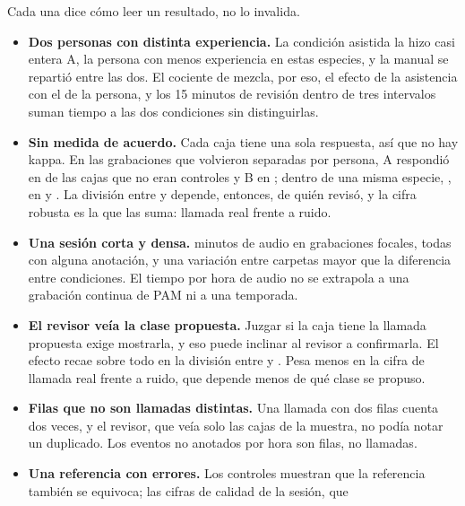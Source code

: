  Cada una dice cómo leer un resultado, no lo invalida.

\begin{itemize}
    \item \textbf{Dos personas con distinta experiencia.} La condición asistida la
          hizo casi entera A, la persona con menos experiencia en estas especies, y
          la manual se repartió entre las dos. El cociente de \uTimeRatio{} mezcla,
          por eso, el efecto de la asistencia con el de la persona, y los 15
          minutos de revisión dentro de tres intervalos suman tiempo a las dos
          condiciones sin distinguirlas.
    \item \textbf{Sin medida de acuerdo.} Cada caja tiene una sola respuesta, así
          que no hay kappa. En las \uPersonRecordings{} grabaciones que volvieron
          separadas por persona, A respondió  en \uPersonBoxA{} de las
          cajas que no eran controles y B en \uPersonBoxB{}; dentro de una misma
          especie, \uPersonSpecies{}, en \uPersonBoxSpeciesA{} y
          \uPersonBoxSpeciesB{}. La división entre  y 
          depende, entonces, de quién revisó, y la cifra robusta es la que las suma:
          llamada real frente a ruido.
    \item \textbf{Una sesión corta y densa.} \uSessionMinutes{} minutos de audio en
          \uSessionRecordings{} grabaciones focales, todas con alguna anotación, y una
          variación entre carpetas mayor que la diferencia entre condiciones. El
          tiempo por hora de audio no se extrapola a una grabación continua de PAM ni
          a una temporada.
    \item \textbf{El revisor veía la clase propuesta.} Juzgar si la caja tiene
          la llamada propuesta exige mostrarla, y eso puede inclinar al revisor a
          confirmarla. El efecto recae sobre todo en la división entre
           y . Pesa menos en la cifra de llamada real
          frente a ruido, que depende menos de qué clase se propuso.
    \item \textbf{Filas que no son llamadas distintas.} Una llamada con dos filas
          cuenta dos veces, y el revisor, que veía solo las cajas de la muestra, no
          podía notar un duplicado. Los eventos no anotados por hora son filas, no
          llamadas.
    \item \textbf{Una referencia con errores.} Los controles muestran que la
          referencia también se equivoca; las cifras de calidad de la sesión, que

\end{itemize}

